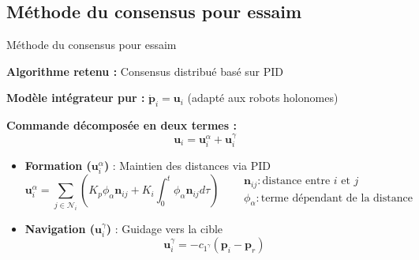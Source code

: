 \subsection{Méthode du consensus pour essaim}
\begin{frame}{Méthode du consensus pour essaim}

\textbf{Algorithme retenu :} Consensus distribué basé sur PID \cite{koung_consensus-based_2020,saif_distributed_2019}

\textbf{Modèle intégrateur pur :} $\dot{\mathbf{p}}_i = \mathbf{u}_i$ (adapté aux robots holonomes)

\textbf{Commande décomposée en deux termes :}
\begin{equation}
\mathbf{u}_i = \mathbf{u}_i^{\alpha} + \mathbf{u}_i^{\gamma}
\end{equation}

\begin{itemize}
\item \textbf{Formation ($\mathbf{u}_i^{\alpha}$)} : Maintien des distances via PID
\begin{equation}
\mathbf{u}_i^{\alpha} = \sum_{j \in \mathcal{N}_i} \left( K_p \phi_{\alpha} \mathbf{n}_{ij} + K_i \int_0^t \phi_{\alpha} \mathbf{n}_{ij} d\tau \right)
\quad
\begin{aligned}
&\mathbf{n}_{ij} : \text{distance entre } i \text{ et } j \\
&\phi_{\alpha} : \text{terme dépendant de la distance}
\end{aligned}
\end{equation}

\item \textbf{Navigation ($\mathbf{u}_i^{\gamma}$)} : Guidage vers la cible
\begin{equation}
\mathbf{u}_i^{\gamma} = -c_{1^\gamma}(\mathbf{p}_i - \mathbf{p}_r)
\end{equation}
\end{itemize}

\end{frame}

